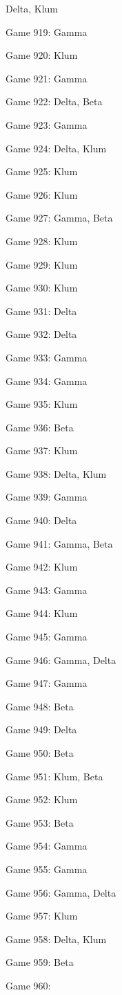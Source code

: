 \documentclass{article}
\begin{document}
\begin{multicols}{3}
\begin{compactitem}
Delta, Klum
\item Game 919:
Gamma
\item Game 920:
Klum
\item Game 921:
Gamma
\item Game 922:
Delta, Beta
\item Game 923:
Gamma
\item Game 924:
Delta, Klum
\item Game 925:
Klum
\item Game 926:
Klum
\item Game 927:
Gamma, Beta
\item Game 928:
Klum
\item Game 929:
Klum
\item Game 930:
Klum
\item Game 931:
Delta
\item Game 932:
Delta
\item Game 933:
Gamma
\item Game 934:
Gamma
\item Game 935:
Klum
\item Game 936:
Beta
\item Game 937:
Klum
\item Game 938:
Delta, Klum
\item Game 939:
Gamma
\item Game 940:
Delta
\item Game 941:
Gamma, Beta
\item Game 942:
Klum
\item Game 943:
Gamma
\item Game 944:
Klum
\item Game 945:
Gamma
\item Game 946:
Gamma, Delta
\item Game 947:
Gamma
\item Game 948:
Beta
\item Game 949:
Delta
\item Game 950:
Beta
\item Game 951:
Klum, Beta
\item Game 952:
Klum
\item Game 953:
Beta
\item Game 954:
Gamma
\item Game 955:
Gamma
\item Game 956:
Gamma, Delta
\item Game 957:
Klum
\item Game 958:
Delta, Klum
\item Game 959:
Beta
\item Game 960:

\end{compactitem}
\end{multicols}
\end{document}
